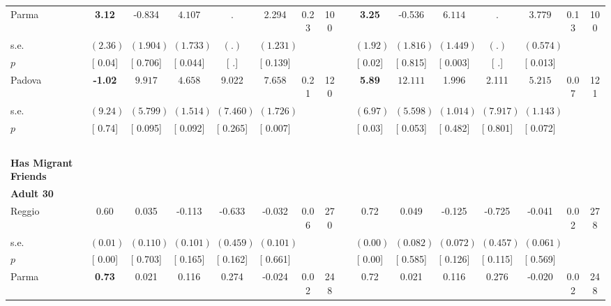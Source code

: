 \begin{longtable}{L{8em} c c c c c c c p{1em} c c c c c c c}
\quad \quad \quad Parma& \textbf{     3.12} &    -0.834 & $ \mathbf{    4.107}$ &         . &     2.294 &      0.23 &       100 & & \textbf{     3.25} &    -0.536 & $ \mathbf{    6.114}$ &         . & $ \mathbf{    3.779}$ &      0.13 &       100  \\*
\quad \quad \quad \quad s.e.& $ (     2.36)$ & $ (    1.904)$ & $ (    1.733)$ & $ (        .)$ & $ (    1.231)$ & & & & $ (     1.92)$ & $ (    1.816)$ & $ (    1.449)$ & $ (        .)$ & $ (    0.574)$ & &  \\*
\quad \quad \quad \quad $ p$ & [     0.04] & [    0.706] & [    0.044] & [        .] & [    0.139] & & & & [     0.02] & [    0.815] & [    0.003] & [        .] & [    0.013] & &  \\[1em]
\quad \quad \quad Padova& \textbf{    -1.02} & $ \mathbf{    9.917}$ & $ \mathbf{    4.658}$ &     9.022 & $ \mathbf{    7.658}$ &      0.21 &       120 & & \textbf{     5.89} & $ \mathbf{   12.111}$ &     1.996 &     2.111 & $ \mathbf{    5.215}$ &      0.07 &       121  \\*
\quad \quad \quad \quad s.e.& $ (     9.24)$ & $ (    5.799)$ & $ (    1.514)$ & $ (    7.460)$ & $ (    1.726)$ & & & & $ (     6.97)$ & $ (    5.598)$ & $ (    1.014)$ & $ (    7.917)$ & $ (    1.143)$ & &  \\*
\quad \quad \quad \quad $ p$ & [     0.74] & [    0.095] & [    0.092] & [    0.265] & [    0.007] & & & & [     0.03] & [    0.053] & [    0.482] & [    0.801] & [    0.072] & &  \\[1em]
~\\[1em]
\textbf{Has Migrant Friends} \\*
\quad \quad \textbf{Adult 30} & & & & & & & & & & & & & & & \\* 
\quad \quad \quad Reggio& 0.60 &     0.035 &    -0.113 &    -0.633 &    -0.032 &      0.06 &       270 & & 0.72 &     0.049 &    -0.125 &    -0.725 &    -0.041 &      0.02 &       278  \\*
\quad \quad \quad \quad s.e.& $ (     0.01)$ & $ (    0.110)$ & $ (    0.101)$ & $ (    0.459)$ & $ (    0.101)$ & & & & $ (     0.00)$ & $ (    0.082)$ & $ (    0.072)$ & $ (    0.457)$ & $ (    0.061)$ & &  \\*
\quad \quad \quad \quad $ p$ & [     0.00] & [    0.703] & [    0.165] & [    0.162] & [    0.661] & & & & [     0.00] & [    0.585] & [    0.126] & [    0.115] & [    0.569] & &  \\[1em]
\quad \quad \quad Parma& \textbf{     0.73} &     0.021 &     0.116 &     0.274 &    -0.024 &      0.02 &       248 & & 0.72 &     0.021 &     0.116 &     0.276 &    -0.020 &      0.02 &       248  \\*

\end{longtable}
